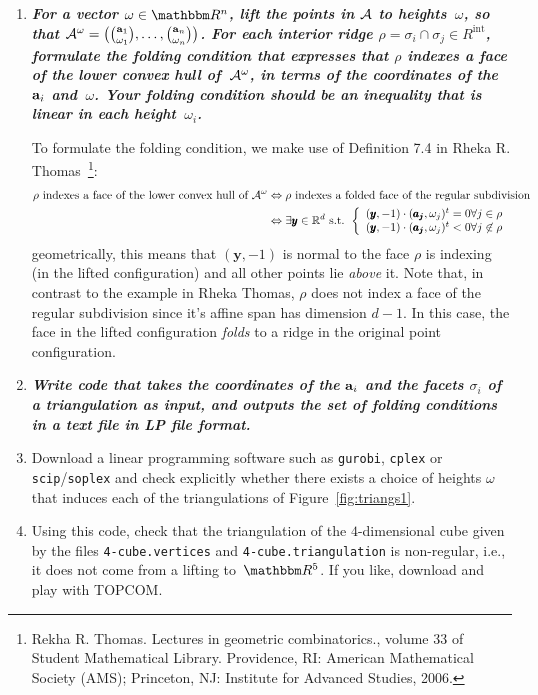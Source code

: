 \begin{enumerate}
  \item
      \textbf{\textit{For a vector $\omega\in\RR^n$, lift the points in $\mathcal{A}$ to heights~$\omega$, so that $\mathcal{A}^\omega=\big(\binom{\mathbf{a}_1}{\omega_1},\dots,\binom{\mathbf{a}_n}{\omega_n}\big)$. For each interior ridge $\rho=\sigma_i\cap\sigma_j\in R^{\text{int}}$, formulate the folding condition that expresses that $\rho$ indexes a face of the lower convex hull of~$\mathcal{A}^\omega$, in terms of the coordinates of the~$\mathbf{a}_i$ and~$\omega$. Your folding condition should be an inequality that is linear in each height~$\omega_i$.}}

To formulate the folding condition, we make use of Definition 7.4 in Rheka R. Thomas~\footnote{Rekha R. Thomas. Lectures in geometric combinatorics., volume 33 of Student Mathematical Library. Providence, RI: American Mathematical Society (AMS); Princeton, NJ: Institute for Advanced Studies, 2006.}:
        \begin{equation*}
            \begin{split}
                \rho \text{ indexes a face of the lower convex hull of } \mathcal{A}^\omega & \Leftrightarrow \rho \text{ indexes a folded face of the regular subdivision } \\
                & \Leftrightarrow \exists \pmb{y} \in \mathbb{R}^{d} \text{ s.t. } \left\lbrace \begin{array}{l} (\pmb{y}, -1) \cdot (\pmb{a_j}, \omega_j)^t = 0 \forall j \in \rho \\ (\pmb{y}, -1) \cdot (\pmb{a_j}, \omega_j)^t < 0 \forall j \not\in \rho \end{array} \right.
            \end{split}
        \end{equation*}
    geometrically, this means that $(\pmb{y}, -1)$ is normal to the face $\rho$ is indexing (in the lifted configuration) and all other points lie \textit{above} it.
    Note that, in contrast to the example in Rheka Thomas, $\rho$ does not index a face of the regular subdivision since it's affine span has dimension $d-1$. 
    In this case, the face in the lifted configuration \textit{folds} to a ridge in the original point configuration.

  \item
        \textbf{\textit{Write code that takes the coordinates of the $\mathbf{a}_i$ and the facets $\sigma_i$ of a triangulation as input, and outputs the set of folding conditions in a text file in LP file format.}}

  \item
    Download a linear programming software such as
    \texttt{gurobi},
    \texttt{cplex} or
    \texttt{scip}/\texttt{soplex}
    and check explicitly whether there exists a choice of heights $\omega$ that induces each of the triangulations of Figure~\ref{fig:triangs1}.

  \item
    Using this code,
    check that the triangulation of the $4$-dimensional cube 
    given by the files \texttt{4-cube.vertices} and \texttt{4-cube.triangulation}
    is non-regular, i.e., it does not come from a lifting to~$\RR^5$.
    If you like, download and play with TOPCOM.
  \end{enumerate}
